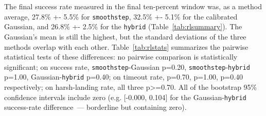 The final success rate measured in the final ten-percent window was, as a method average, 27.8\% +- 5.5\% for \texttt{smoothstep}, 32.5\% +- 5.1\% for the calibrated Gaussian, and 26.8\% +- 2.5\% for the \texttt{hybrid} (Table~\ref{tab:rlsummary}). The Gaussian's mean is still the highest, but the standard deviations of the three methods overlap with each other. Table~\ref{tab:rlstats} summarizes the pairwise statistical tests of these differences: no pairwise comparison is statistically significant; on success rate, \texttt{smoothstep}-Gaussian p=0.20, \texttt{smoothstep}-\texttt{hybrid} p=1.00, Gaussian-\texttt{hybrid} p=0.40; on timeout rate, p=0.70, p=1.00, p=0.40 respectively; on harsh-landing rate, all three p>=0.70. All of the bootstrap 95\% confidence intervals include zero (e.g. [-0.000, 0.104] for the Gaussian-\texttt{hybrid} success-rate difference~--- borderline but containing zero).
